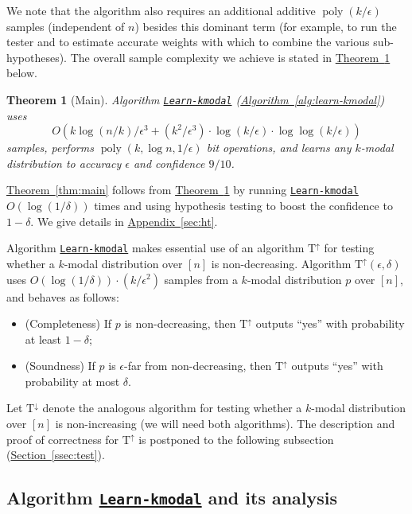 \documentclass[10pt]{article}
\newtheorem{theorem}{Theorem}[section]
\theoremstyle{definition}
\numberwithin{equation}{section}
\newcommand{\expref}[2]{\texorpdfstring{\hyperref[#2]{#1~\ref{#2}}}{#1~\ref{#2}}}
\newcommand{\algorithml}[1]{{\normalfont\texttt{#1}}}
\newcommand{\eps}{\epsilon}
\newcommand{\poly}{\operatorname{poly}}
\newcommand{\TND}{{\mathrm{T^{\uparrow}}}}
\newcommand{\TNI}{{\mathrm{T^{\downarrow}}}}
\begin{document}
We note that the algorithm also requires an additional additive
$\poly(k/\eps)$ samples (independent of $n$) besides this dominant term
(for example, to run the tester and to estimate accurate weights with
which to combine the various sub-hypotheses).  The overall sample complexity we achieve is stated in \expref{Theorem}{thm:learnkmodal} below.

%

\begin{theorem}[Main] \label{thm:learnkmodal}
%
Algorithm
{\hyperref[alg:learn-kmodal]{\algorithml{Learn-kmodal}}}
%
(\expref{Algorithm}{alg:learn-kmodal})
%
uses
$$O\left(k\log(n/k)/\eps^3 + ({k^2}/\eps^3)\cdot \log(k/\eps) \cdot \log\log(k/\eps) \right)$$
samples, performs  $\poly(k, \log n, 1/\eps)$
bit operations, and learns any $k$-modal distribution to accuracy $\eps$
and confidence $9/10$.
\end{theorem}

\expref{Theorem}{thm:main} follows from \expref{Theorem}{thm:learnkmodal}
by running \hyperref[alg:learn-kmodal]{\algorithml{Learn-kmodal}} $O(\log(1/\delta))$ times and
using hypothesis testing to boost the confidence to $1-\delta$.
 We give details in \expref{Appendix}{sec:ht}.

Algorithm \hyperref[alg:learn-kmodal]{\algorithml{Learn-kmodal}} makes essential use of
an algorithm $\TND$ for testing whether a $k$-modal distribution over $[n]$
is non-decreasing.
Algorithm $\TND(\eps,\delta)$ uses $O(\log(1/\delta)) \cdot {(k/\eps^2)}$ samples from a $k$-modal
distribution $p$ over $[n]$, and behaves as follows:


\begin{itemize}
\item (Completeness) If $p$ is non-decreasing, then $\TND$ outputs ``yes'' with probability at least $1-\delta$;


\item (Soundness) If $p$ is $\eps$-far from non-decreasing, then $\TND$ outputs ``yes'' with probability at most $\delta$.
\end{itemize}


\noindent Let $\TNI$ denote the analogous algorithm for testing whether a $k$-modal distribution
over $[n]$ is non-increasing (we will need both algorithms). The description and proof of correctness for $\TND$ is postponed to the following subsection (\expref{Section}{ssec:test}).

\subsection{Algorithm \texorpdfstring{\hyperref[alg:learn-kmodal]{\algorithml{Learn-kmodal}}}{Learn-kmodal} and its analysis} \label{ssec:learn-main}
\end{document}
